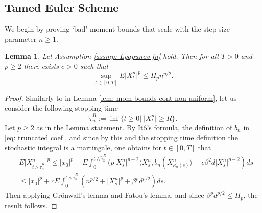 \documentclass{article}
\newtheorem{lemma}{Lemma}
\begin{document}
\subsection{Tamed Euler Scheme}
We begin by proving `bad' moment bounds that scale with the step-size parameter $n\geq 1$.
\begin{lemma}\label{lem: bad mom bounds scheme}
   Let Assumption \ref{assmp: Lyapunov fn} hold. Then for all $T>0$ and $p\geq 2$ there exists $c>0$ such that
    \begin{equation}
      \sup_{t\in [0,T]}E\lvert X^n_t\rvert^p\leq H_pn^{p/2}.
    \end{equation}
\end{lemma}
\begin{proof}
    Similarly to in Lemma \ref{lem: mom bounds cont non-uniform}, let us consider the following stopping time
    \begin{equation}
     \tilde{\tau}_n^R:=\inf\{t\geq 0\vert \; \lvert X^n_t\rvert\geq R\}. 
    \end{equation} 
    Let $p\geq 2$ as in the Lemma statement. By Itô's formula, the definition of $b_n$ in \eqref{eq: truncated coef}, and since by this and the stopping time definition the stochastic integral is a martingale, one obtains for $t\in [0,T]$ that
    \begin{align}\label{eq: Ito for stopped}
  &E\lvert X^n_{t \wedge \tilde{\tau}_n^R} \rvert^{p}\leq \lvert x_0\rvert^p+E\int^{t  \wedge \tilde{\tau}_n^R}_0 (p\lvert X^n_s\rvert^{p-2}\langle X^n_s, b_n(X^n_{\kappa_n(s)}\rangle +c\beta^2 d\lvert X^n_s \rvert^{p-2})ds \nonumber \\
  &\leq \lvert x_0\rvert^p+cE\int^{t  \wedge \tilde{\tau}_n^R}_0 (n^{p/2} +\lvert X^n_s \rvert^p+ \beta^pd^{p/2} )ds.
    \end{align}
   Then applying Grönwall's lemma and Fatou's lemma, and since $\beta^pd^{p/2}\leq H_p$, the result follows.
    \end{proof}
\end{document}
